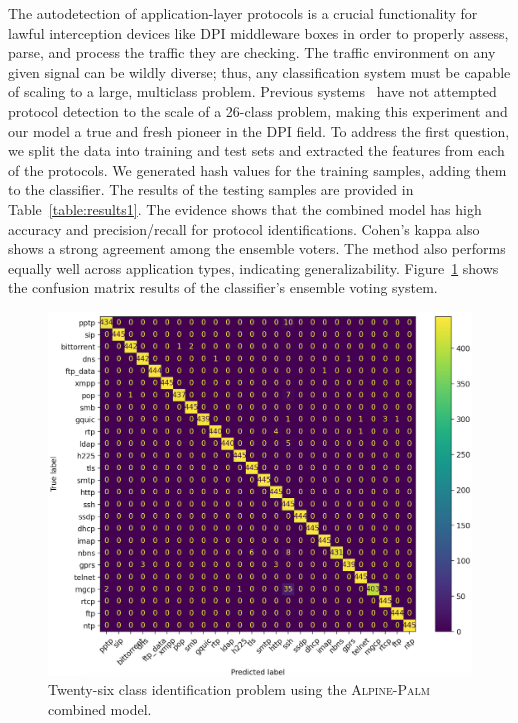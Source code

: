 The autodetection of application-layer protocols is a crucial functionality for lawful interception devices like DPI middleware boxes in order to properly assess, parse, and process the traffic they are checking. The traffic environment on any given signal can be wildly diverse; thus, any classification system must be capable of scaling to a large, multiclass problem. Previous systems~\cite{hslf, fpga} have not attempted protocol detection to the scale of a 26-class problem, making this experiment and our model a true and fresh pioneer in the DPI field. To address the first question, we split the data into training and test sets and extracted the features from each of the protocols. We generated hash values for the training samples, adding them to the classifier. The results of the testing samples are provided in Table~\ref{table:results1}. The evidence shows that the combined model has high accuracy and precision/recall for protocol identifications. Cohen's kappa also shows a strong agreement among the ensemble voters. The method also performs equally well across application types, indicating generalizability. Figure~\ref{fig:combined} shows the confusion matrix results of the classifier's ensemble voting system.

\begin{figure} [ht!]
  \centering
  \includegraphics[width=\columnwidth]{chapters/4/img/combined.png}
  \caption{Twenty-six class identification problem using the \textsc{Alpine}-\textsc{Palm} combined model.}
  \label{fig:combined}
\end{figure}

